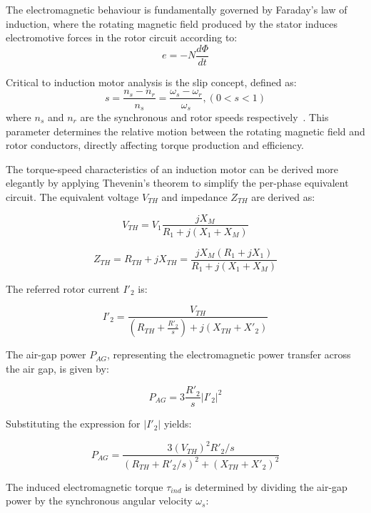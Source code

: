 \documentclass[a4paper,12pt]{IEEEtran}
\begin{document}
The electromagnetic behaviour is fundamentally governed by Faraday's law of induction, where the rotating magnetic field produced by the stator induces electromotive forces in the rotor circuit according to:
\begin{equation}
e = -N\frac{d\Phi}{dt}
\end{equation}

Critical to induction motor analysis is the slip concept, defined as:
\begin{equation}
s = \frac{n_s - n_r}{n_s} = \frac{\omega_s - \omega_r}{\omega_s}, (0<s<1)
\end{equation}
where $n_s$ and $n_r$ are the synchronous and rotor speeds respectively~\cite{ong1998}. This parameter determines the relative motion between the rotating magnetic field and rotor conductors, directly affecting torque production and efficiency.

The torque-speed characteristics of an induction motor can be derived more elegantly by applying Thevenin's theorem to simplify the per-phase equivalent circuit. The equivalent voltage $V_{TH}$ and impedance $Z_{TH}$ are derived as:

\begin{equation}
V_{TH} = V_1 \frac{jX_M}{R_1 + j(X_1 + X_M)}
\end{equation}

\begin{equation}
Z_{TH}=R_{TH}+jX_{TH} = \frac{jX_M(R_1 + jX_1)}{R_1 + j(X_1 + X_M)}
\end{equation}

The referred rotor current $I'_2$ is:

\begin{equation}
I'_2 = \frac{V_{TH}}{\left(R_{TH} + \frac{R'_2}{s}\right) + j(X_{TH} + X'_2)}
\end{equation}

The air-gap power $P_{AG}$, representing the electromagnetic power transfer across the air gap, is given by:

\begin{equation}
P_{AG} = 3 \frac{R'_2}{s} |I'_2|^2
\end{equation}

Substituting the expression for $|I'_2|$ yields:

\begin{equation}
P_{AG} = \frac{3(V_{TH})^2 R'_2/s}{(R_{TH} + R'_2/s)^2 + (X_{TH} + X'_2)^2}
\end{equation}

The induced electromagnetic torque $\tau_{ind}$ is determined by dividing the air-gap power by the synchronous angular velocity $\omega_s$:
\end{document}
